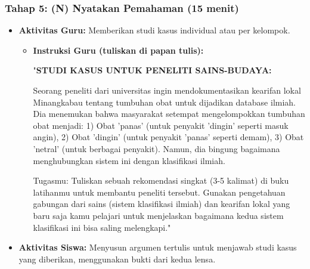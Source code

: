 \documentclass[a4paper,12pt]{article}
\begin{document}
\subsubsection{Tahap 5: (N) Nyatakan Pemahaman (15 menit)}
\begin{itemize}
\item \textbf{Aktivitas Guru:} Memberikan studi kasus individual atau per kelompok.
    \begin{itemize}
    \item \textbf{Instruksi Guru (tuliskan di papan tulis):}
    
    "\textbf{STUDI KASUS UNTUK PENELITI SAINS-BUDAYA:}
    
    Seorang peneliti dari universitas ingin mendokumentasikan kearifan lokal Minangkabau tentang tumbuhan obat untuk dijadikan database ilmiah. Dia menemukan bahwa masyarakat setempat mengelompokkan tumbuhan obat menjadi: 1) Obat 'panas' (untuk penyakit 'dingin' seperti masuk angin), 2) Obat 'dingin' (untuk penyakit 'panas' seperti demam), 3) Obat 'netral' (untuk berbagai penyakit). Namun, dia bingung bagaimana menghubungkan sistem ini dengan klasifikasi ilmiah.
    
    Tugasmu: Tuliskan sebuah rekomendasi singkat (3-5 kalimat) di buku latihanmu untuk membantu peneliti tersebut. Gunakan pengetahuan gabungan dari sains (sistem klasifikasi ilmiah) dan kearifan lokal yang baru saja kamu pelajari untuk menjelaskan bagaimana kedua sistem klasifikasi ini bisa saling melengkapi."
    \end{itemize}
\item \textbf{Aktivitas Siswa:} Menyusun argumen tertulis untuk menjawab studi kasus yang diberikan, menggunakan bukti dari kedua lensa.
\end{itemize}
\end{document}
